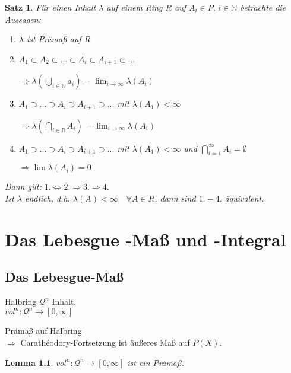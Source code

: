 \documentclass[11pt]{memoir}
\theoremstyle{changebreak}
\newtheorem{Lemma}{Lemma}[chapter]
\newtheorem{Satz}{Satz}[chapter]
\newcommand{\cara}{Carathéodory-Fortsetzung}
\begin{document}
\begin{Satz}
Für einen Inhalt $\lambda$ auf einem Ring $R$ auf $A_i \in P,\, i \in \mathbb N$ betrachte die Aussagen:
\begin{enumerate}
	\item $\lambda$ ist Prämaß auf $R$
	\item $A_1 \subset A_2 \subset ... \subset A_i \subset A_{i+1} \subset ...$
	\begin{center}
		$\Rightarrow \lambda\left( \bigcup_{i \in \mathbb N} a_i \right) = \lim_{i \rightarrow \infty} \lambda(A_i)$
	\end{center}
	\item $A_1 \supset ... \supset A_i \supset A_{i+1} \supset ...$ mit $\lambda(A_1) < \infty$
	\begin{center}
		$\Rightarrow \lambda\left(\bigcap_{i \in \mathbb B} A_i \right) = \lim_{i\rightarrow \infty} \lambda(A_i)$
	\end{center}
	\item $A_1 \supset ... \supset A_i \supset A_{i+1} \supset ...$ mit $\lambda(A_1) <  \infty$ und $\bigcap\limits_{i=1}^\infty A_i = \emptyset$
	\begin{center}
		$\Rightarrow \lim \lambda(A_i) = 0$
	\end{center}
\end{enumerate}
Dann gilt: $1. \Leftrightarrow 2. \Rightarrow 3. \Rightarrow 4.$ \\
Ist $\lambda$ endlich, d.h. $\lambda(A) < \infty \quad \forall A \in R$, dann sind $1. - 4.$ äquivalent.
\end{Satz}


\newpage

\chapter{Das Lebesgue -Maß und -Integral}
\section{Das Lebesgue-Maß}

Halbring $\mathscr{Q}^n$ Inhalt.\\
$vol^n : \mathscr{Q}^n \rightarrow [0, \infty]$


	Prämaß auf Halbring\\
	$\Rightarrow$ \cara{} ist äußeres Maß auf $P(X)$.

\begin{Lemma}
	$vol^n : \mathscr{Q}^n \rightarrow [0, \infty]$ ist ein Prämaß.
\end{Lemma}
\end{document}
